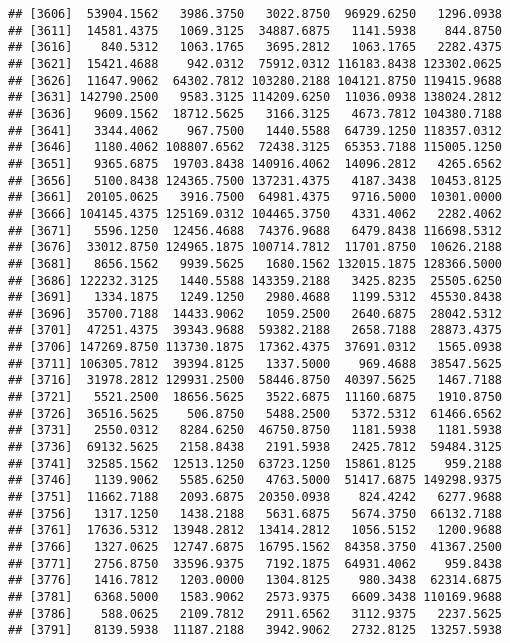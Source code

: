 \documentclass[]{article}
\begin{document}
\begin{verbatim}
## [3606]  53904.1562   3986.3750   3022.8750  96929.6250   1296.0938
## [3611]  14581.4375   1069.3125  34887.6875   1141.5938    844.8750
## [3616]    840.5312   1063.1765   3695.2812   1063.1765   2282.4375
## [3621]  15421.4688    942.0312  75912.0312 116183.8438 123302.0625
## [3626]  11647.9062  64302.7812 103280.2188 104121.8750 119415.9688
## [3631] 142790.2500   9583.3125 114209.6250  11036.0938 138024.2812
## [3636]   9609.1562  18712.5625   3166.3125   4673.7812 104380.7188
## [3641]   3344.4062    967.7500   1440.5588  64739.1250 118357.0312
## [3646]   1180.4062 108807.6562  72438.3125  65353.7188 115005.1250
## [3651]   9365.6875  19703.8438 140916.4062  14096.2812   4265.6562
## [3656]   5100.8438 124365.7500 137231.4375   4187.3438  10453.8125
## [3661]  20105.0625   3916.7500  64981.4375   9716.5000  10301.0000
## [3666] 104145.4375 125169.0312 104465.3750   4331.4062   2282.4062
## [3671]   5596.1250  12456.4688  74376.9688   6479.8438 116698.5312
## [3676]  33012.8750 124965.1875 100714.7812  11701.8750  10626.2188
## [3681]   8656.1562   9939.5625   1680.1562 132015.1875 128366.5000
## [3686] 122232.3125   1440.5588 143359.2188   3425.8235  25505.6250
## [3691]   1334.1875   1249.1250   2980.4688   1199.5312  45530.8438
## [3696]  35700.7188  14433.9062   1059.2500   2640.6875  28042.5312
## [3701]  47251.4375  39343.9688  59382.2188   2658.7188  28873.4375
## [3706] 147269.8750 113730.1875  17362.4375  37691.0312   1565.0938
## [3711] 106305.7812  39394.8125   1337.5000    969.4688  38547.5625
## [3716]  31978.2812 129931.2500  58446.8750  40397.5625   1467.7188
## [3721]   5521.2500  18656.5625   3522.6875  11160.6875   1910.8750
## [3726]  36516.5625    506.8750   5488.2500   5372.5312  61466.6562
## [3731]   2550.0312   8284.6250  46750.8750   1181.5938   1181.5938
## [3736]  69132.5625   2158.8438   2191.5938   2425.7812  59484.3125
## [3741]  32585.1562  12513.1250  63723.1250  15861.8125    959.2188
## [3746]   1139.9062   5585.6250   4763.5000  51417.6875 149298.9375
## [3751]  11662.7188   2093.6875  20350.0938    824.4242   6277.9688
## [3756]   1317.1250   1438.2188   5631.6875   5674.3750  66132.7188
## [3761]  17636.5312  13948.2812  13414.2812   1056.5152   1200.9688
## [3766]   1327.0625  12747.6875  16795.1562  84358.3750  41367.2500
## [3771]   2756.8750  33596.9375   7192.1875  64931.4062    959.8438
## [3776]   1416.7812   1203.0000   1304.8125    980.3438  62314.6875
## [3781]   6368.5000   1583.9062   2573.9375   6609.3438 110169.9688
## [3786]    588.0625   2109.7812   2911.6562   3112.9375   2237.5625
## [3791]   8139.5938  11187.2188   3942.9062   2732.8125  13257.5938

\end{verbatim}
\end{document}
